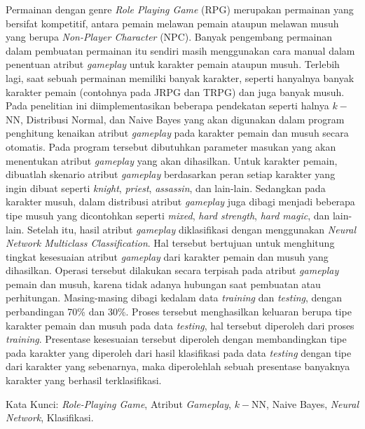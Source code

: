 \begin{spacing}{1}
	Permainan dengan genre \textit{Role Playing Game} (RPG) merupakan permainan yang bersifat kompetitif, antara pemain melawan pemain ataupun melawan musuh yang berupa \textit{Non-Player Character} (NPC). Banyak pengembang permainan dalam pembuatan permainan itu sendiri masih menggunakan cara manual dalam penentuan atribut \textit{gameplay} untuk karakter pemain ataupun musuh. Terlebih lagi, saat sebuah permainan memiliki banyak karakter, seperti hanyalnya banyak karakter pemain (contohnya pada JRPG dan TRPG) dan juga banyak musuh. Pada penelitian ini diimplementasikan beberapa pendekatan seperti halnya $k-$NN, Distribusi Normal, dan Naive Bayes yang akan digunakan dalam program penghitung kenaikan atribut \textit{gameplay} pada karakter pemain dan musuh secara otomatis. Pada program tersebut dibutuhkan parameter masukan yang akan menentukan atribut \textit{gameplay} yang akan dihasilkan. Untuk karakter pemain, dibuatlah skenario atribut \textit{gameplay} berdasarkan peran setiap karakter yang ingin dibuat seperti \textit{knight}, \textit{priest}, \textit{assassin}, dan lain-lain. Sedangkan pada karakter musuh, dalam distribusi atribut \textit{gameplay} juga dibagi menjadi beberapa tipe musuh yang dicontohkan seperti \textit{mixed}, \textit{hard strength}, \textit{hard magic}, dan lain-lain. Setelah itu, hasil atribut \textit{gameplay} diklasifikasi dengan menggunakan \textit{Neural Network Multiclass Classification}. Hal tersebut bertujuan untuk menghitung tingkat kesesuaian atribut \textit{gameplay} dari karakter pemain dan musuh yang dihasilkan. Operasi tersebut dilakukan secara terpisah pada atribut \textit{gameplay} pemain dan musuh, karena tidak adanya hubungan saat pembuatan atau perhitungan. Masing-masing dibagi kedalam data \textit{training} dan \textit{testing}, dengan perbandingan 70\% dan 30\%. Proses tersebut menghasilkan keluaran berupa tipe karakter pemain dan musuh pada data \textit{testing}, hal tersebut diperoleh dari proses \textit{training}. Presentase kesesuaian tersebut diperoleh dengan membandingkan tipe pada karakter yang diperoleh dari hasil klasifikasi pada data \textit{testing} dengan tipe dari karakter yang sebenarnya, maka diperolehlah sebuah presentase banyaknya karakter yang berhasil terklasifikasi.
	\vspace{2ex}
	

	Kata Kunci: \textit{Role-Playing Game}, Atribut \textit{Gameplay}, $k-$NN, Naive Bayes, \textit{Neural Network}, Klasifikasi.
\end{spacing}